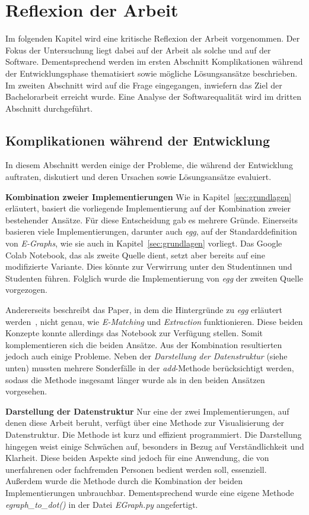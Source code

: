 \section{Reflexion der Arbeit}\label{sec:reflexion}

Im folgenden Kapitel wird eine kritische Reflexion der Arbeit vorgenommen. 
Der Fokus der Untersuchung liegt dabei auf der Arbeit als solche und auf der Software.
Dementsprechend werden im ersten Abschnitt Komplikationen während der Entwicklungsphase thematisiert sowie mögliche Lösungsansätze beschrieben.
Im zweiten Abschnitt wird auf die Frage eingegangen, inwiefern das Ziel der Bachelorarbeit erreicht wurde.
Eine Analyse der Softwarequalität wird im dritten Abschnitt durchgeführt.

\subsection{Komplikationen während der Entwicklung}\label{sec:probleme}

In diesem Abschnitt werden einige der Probleme, die während der Entwicklung auftraten, diskutiert und deren Ursachen sowie Lösungsansätze evaluiert.

\noindent\textbf{Kombination zweier Implementierungen} Wie in Kapitel~\ref{sec:grundlagen} erläutert, basiert die vorliegende Implementierung
auf der Kombination zweier bestehender Ansätze. Für diese Entscheidung gab es mehrere Gründe.
Einerseits basieren viele Implementierungen, darunter auch \textit{egg}, auf der Standarddefinition von \textit{E-Graphs}, wie sie auch in Kapitel~\ref{sec:grundlagen} vorliegt.
Das Google Colab Notebook, das als zweite Quelle dient, setzt aber bereits auf eine modifizierte Variante. Dies könnte zur Verwirrung unter den Studentinnen und Studenten
führen. Folglich wurde die Implementierung von \textit{egg} der zweiten Quelle vorgezogen.

Andererseits beschreibt das Paper, in dem die Hintergründe zu \textit{egg} erläutert werden~\cite{2021-egg}, nicht genau, wie \textit{E-Matching} und \textit{Extraction} funktionieren.  
Diese beiden Konzepte konnte allerdings das Notebook zur Verfügung stellen. Somit komplementieren sich die beiden Ansätze.
Aus der Kombination resultierten jedoch auch einige Probleme. Neben der \textit{Darstellung der Datenstruktur} (siehe unten) mussten mehrere Sonderfälle in der \textit{add}-Methode
berücksichtigt werden, sodass die Methode insgesamt länger wurde als in den beiden Ansätzen vorgesehen.

\noindent\textbf{Darstellung der Datenstruktur} Nur eine der zwei Implementierungen, auf denen diese Arbeit beruht, verfügt über eine Methode zur Visualisierung der Datenstruktur.
Die Methode ist kurz und effizient programmiert. Die Darstellung hingegen weist einige Schwächen auf, besonders in Bezug auf Verständlichkeit und Klarheit.
Diese beiden Aspekte sind jedoch für eine Anwendung, die von unerfahrenen oder fachfremden Personen bedient werden soll, essenziell.
Außerdem wurde die Methode durch die Kombination der beiden Implementierungen unbrauchbar.
Dementsprechend wurde eine eigene Methode \textit{egraph\_to\_dot()} in der Datei \textit{EGraph.py} angefertigt.

